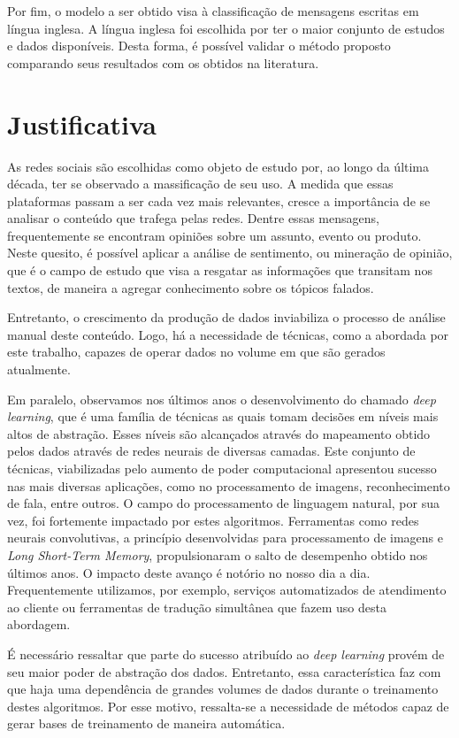 Por fim, o modelo a ser obtido visa à classificação de mensagens escritas em língua inglesa.
A língua inglesa foi escolhida por ter o maior conjunto de estudos e dados disponíveis.
Desta forma, é possível validar o método proposto comparando seus resultados com os obtidos na literatura.

\section{Justificativa}

As redes sociais são escolhidas como objeto de estudo por, ao longo da última década, ter se observado a massificação
de seu uso.
A medida que essas plataformas passam a ser cada vez mais relevantes, cresce a importância de se analisar o conteúdo
que trafega pelas redes.
Dentre essas mensagens, frequentemente se encontram opiniões sobre um assunto, evento ou produto.
Neste quesito, é possível aplicar a análise de sentimento, ou mineração de opinião, que é o campo de estudo que visa a
resgatar as informações que transitam nos textos, de maneira a agregar conhecimento sobre os tópicos falados.

Entretanto, o crescimento da produção de dados inviabiliza o processo de análise manual deste conteúdo.
Logo, há a necessidade de técnicas, como a abordada por este trabalho, capazes de operar dados no volume em que são
gerados atualmente.

Em paralelo, observamos nos últimos anos o desenvolvimento do chamado \textit{deep learning}, que é uma família de
técnicas as quais tomam decisões em níveis mais altos de abstração.
Esses níveis são alcançados através do mapeamento obtido pelos dados através de redes neurais de diversas camadas.
Este conjunto de técnicas, viabilizadas pelo aumento de poder computacional apresentou sucesso nas mais diversas
aplicações, como no processamento de imagens, reconhecimento de fala, entre outros.
O campo do processamento de linguagem natural, por sua vez, foi fortemente impactado por estes algoritmos.
Ferramentas como redes neurais convolutivas, a princípio desenvolvidas para processamento de imagens e
\textit{Long Short-Term Memory}, propulsionaram o salto de desempenho obtido nos últimos anos.
O impacto deste avanço é notório no nosso dia a dia.
Frequentemente utilizamos, por exemplo, serviços automatizados de atendimento ao cliente ou ferramentas de tradução
simultânea que fazem uso desta abordagem.

É necessário ressaltar que parte do sucesso atribuído ao \textit{deep learning} provém de seu maior poder de abstração
dos dados.
Entretanto, essa característica faz com que haja uma dependência de grandes volumes de dados durante o treinamento
destes algoritmos.
Por esse motivo, ressalta-se a necessidade de métodos capaz de gerar bases de treinamento de maneira automática.

